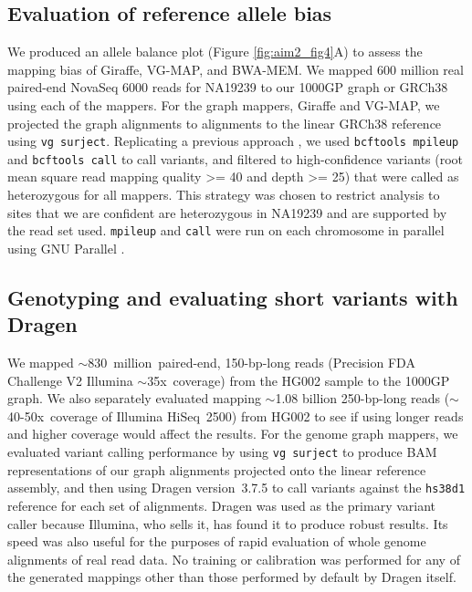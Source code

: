 \documentclass[11pt]{ucscthesis}
\begin{document}
\subsection{Evaluation of reference allele bias}
\label{subsec:aim2:srgiraffe_allelebias}
We produced an allele balance plot (Figure \ref{fig:aim2_fig4}A) to assess the mapping bias of Giraffe, VG-MAP, and BWA-MEM.
We mapped 600 million real paired-end NovaSeq 6000 reads for NA19239 to our 1000GP graph or GRCh38 using each of the mappers.
For the graph mappers, Giraffe and VG-MAP, we projected the graph alignments to alignments to the linear GRCh38 reference using \texttt{vg surject}.
Replicating a previous approach \cite{crysnanto_bovine_2020}, we used \texttt{bcftools mpileup} and \texttt{bcftools call}\cite{li_samtools_2011} to call variants, and filtered to high-confidence variants (root mean square read mapping quality >= 40 and depth >= 25) that were called as heterozygous for all mappers.
This strategy was chosen to restrict analysis to sites that we are confident are heterozygous in NA19239 and are supported by the read set used.
\texttt{mpileup} and \texttt{call} were run on each chromosome in parallel using GNU Parallel \cite{Tange2011a}.

\subsection{Genotyping and evaluating short variants with Dragen}
\label{subsec:aim2:dragen}

We mapped $\sim$830~million~paired-end, 150-bp-long reads (Precision FDA Challenge V2 Illumina $\sim$35x~coverage) from the HG002 sample to the 1000GP graph.
We also separately evaluated mapping $\sim$1.08 billion 250-bp-long reads ($\sim$40-50x~coverage of Illumina HiSeq~2500) from HG002 to see if using longer reads and higher coverage would affect the results.
For the genome graph mappers, we evaluated variant calling performance by using \texttt{vg~surject} to produce BAM representations of our graph alignments projected onto the linear reference assembly, and then using Dragen version~3.7.5 to call variants against the \texttt{hs38d1} reference for each set of alignments.
Dragen was used as the primary variant caller because Illumina, who sells it, has found it to produce robust results\cite{illumina_dragen_2019,illumina_dragen_pfda_2017,illumina_dragen_pfda_2020}.
Its speed was also useful for the purposes of rapid evaluation of whole genome alignments of real read data.
No training or calibration was performed for any of the generated mappings other than those performed by default by Dragen itself.
\end{document}
